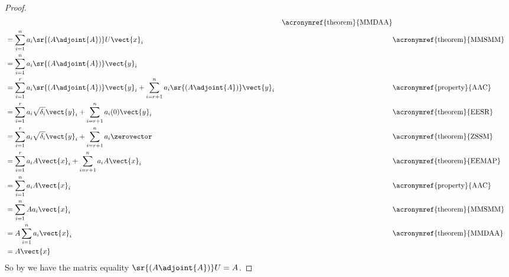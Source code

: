 \begin{proof}
\begin{align*}
&&\text{\acronymref{theorem}{MMDAA}}\\
%
&=\sum_{i=1}^{n}a_i\sr{\left(A\adjoint{A}\right)}U\vect{x}_i
&&\text{\acronymref{theorem}{MMSMM}}\\
%
&=\sum_{i=1}^{n}a_i\sr{\left(A\adjoint{A}\right)}\vect{y}_i\\
%
&=\sum_{i=1}^{r}a_i\sr{\left(A\adjoint{A}\right)}\vect{y}_i
+\sum_{i=r+1}^{n}a_i\sr{\left(A\adjoint{A}\right)}\vect{y}_i
&&\text{\acronymref{property}{AAC}}\\
%
&=\sum_{i=1}^{r}a_i\sqrt{\delta_i}\vect{y}_i
+\sum_{i=r+1}^{n}a_i(0)\vect{y}_i
&&\text{\acronymref{theorem}{EESR}}\\
%
&=\sum_{i=1}^{r}a_i\sqrt{\delta_i}\vect{y}_i
+\sum_{i=r+1}^{n}a_i\zerovector
&&\text{\acronymref{theorem}{ZSSM}}\\
%
&=\sum_{i=1}^{r}a_iA\vect{x}_i
+\sum_{i=r+1}^{n}a_iA\vect{x}_i
&&\text{\acronymref{theorem}{EEMAP}}\\
%
&=\sum_{i=1}^{n}a_iA\vect{x}_i
&&\text{\acronymref{property}{AAC}}\\
%
&=\sum_{i=1}^{n}Aa_i\vect{x}_i
&&\text{\acronymref{theorem}{MMSMM}}\\
%
&=A\sum_{i=1}^{n}a_i\vect{x}_i
&&\text{\acronymref{theorem}{MMDAA}}\\
%
&=A\vect{x}
%
\end{align*}
%
So by  we have the matrix equality $\sr{\left(A\adjoint{A}\right)}U=A$.
%
\end{proof}
%  
